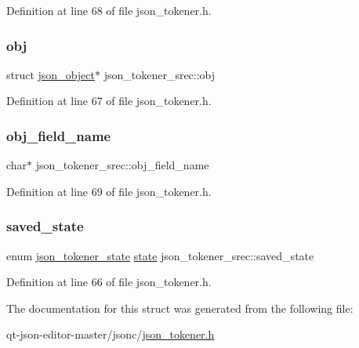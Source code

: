Definition at line 68 of file json\+\_\+tokener.\+h.

\mbox{\label{structjson__tokener__srec_ad2bb71affec1da5ba1d9952c3bf2c12a}} 
\subsubsection{\texorpdfstring{obj}{obj}}
{\footnotesize\ttfamily struct \hyperlink{structjson__object}{json\+\_\+object}$\ast$ json\+\_\+tokener\+\_\+srec\+::obj}



Definition at line 67 of file json\+\_\+tokener.\+h.

\mbox{\label{structjson__tokener__srec_a99551c172e97ac2e7a3849a50b4f51ca}} 
\subsubsection{\texorpdfstring{obj\+\_\+field\+\_\+name}{obj\_field\_name}}
{\footnotesize\ttfamily char$\ast$ json\+\_\+tokener\+\_\+srec\+::obj\+\_\+field\+\_\+name}



Definition at line 69 of file json\+\_\+tokener.\+h.

\mbox{\label{structjson__tokener__srec_a868b9912dbb1e4813a630c944f522d48}} 
\subsubsection{\texorpdfstring{saved\+\_\+state}{saved\_state}}
{\footnotesize\ttfamily enum \hyperlink{json__tokener_8h_af026dec71e4548e6200eb2f902f1c4e2}{json\+\_\+tokener\+\_\+state} \hyperlink{json__tokener_8c_a17ba9d3d3f420182822febf73adca0a4}{state} json\+\_\+tokener\+\_\+srec\+::saved\+\_\+state}



Definition at line 66 of file json\+\_\+tokener.\+h.



The documentation for this struct was generated from the following file\+:\begin{DoxyCompactItemize}
\item 
qt-\/json-\/editor-\/master/jsonc/\hyperlink{json__tokener_8h}{json\+\_\+tokener.\+h}\end{DoxyCompactItemize}
